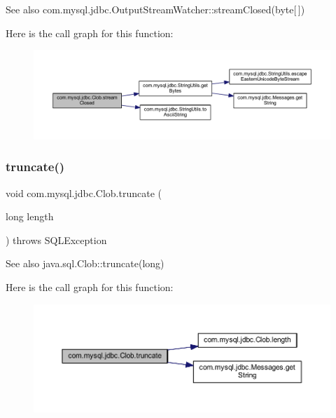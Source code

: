\begin{DoxySeeAlso}{See also}
com.\+mysql.\+jdbc.\+Output\+Stream\+Watcher\+::stream\+Closed(byte\mbox{[}$\,$\mbox{]}) 
\end{DoxySeeAlso}
Here is the call graph for this function\+:\nopagebreak
\begin{figure}[H]
\begin{center}
\leavevmode
\includegraphics[width=350pt]{classcom_1_1mysql_1_1jdbc_1_1_clob_a70ec18cf9f17467e40d95a64db72866e_cgraph}
\end{center}
\end{figure}
\mbox{\label{classcom_1_1mysql_1_1jdbc_1_1_clob_a7d245e2b037ea85293c17e6403696f6f}} 
\subsubsection{\texorpdfstring{truncate()}{truncate()}}
{\footnotesize\ttfamily void com.\+mysql.\+jdbc.\+Clob.\+truncate (\begin{DoxyParamCaption}\item[{long}]{length }\end{DoxyParamCaption}) throws S\+Q\+L\+Exception}

\begin{DoxySeeAlso}{See also}
java.\+sql.\+Clob\+::truncate(long) 
\end{DoxySeeAlso}
Here is the call graph for this function\+:\nopagebreak
\begin{figure}[H]
\begin{center}
\leavevmode
\includegraphics[width=350pt]{classcom_1_1mysql_1_1jdbc_1_1_clob_a7d245e2b037ea85293c17e6403696f6f_cgraph}
\end{center}
\end{figure}
\mbox{\label{classcom_1_1mysql_1_1jdbc_1_1_clob_a1805514024772c139eb896eca9a73b1c}} 
